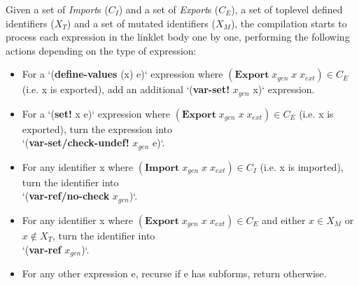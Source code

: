 			\begin{paragraph-here}
				Given a set of \emph{Import}s ($\mathit{C_I}$) and a set of
				\emph{Export}s ($\mathit{C_E}$), a set of toplevel defined
				identifiers ($\mathit{X_T}$) and a set of mutated identifiers
				($\mathit{X_M}$), the compilation starts to process each expression in
				the linklet body one by one, performing the following actions
				depending on the type of expression:

			\end{paragraph-here}

			\begin{itemize}
			\small
			\item For a `(\textbf{define-values} (x) e)` expression where $(\textbf{Export}\; x_{gen}\; x\; x_{ext}) \in \mathit{C_E}$ (i.e. x is exported), add an additional `(\textbf{var-set!} $x_{gen}$ x)` expression.
			\item For a `(\textbf{set!} x e)` expression where $(\textbf{Export}\; x_{gen}\; x\; x_{ext}) \in \mathit{C_E}$ (i.e. x is exported), turn the expression into \\ `(\textbf{var-set/check-undef!} $x_{gen}$ e)`.
			\item For any identifier x where $(\textbf{Import}\; x_{gen}\; x\; x_{ext}) \in \mathit{C_I}$  (i.e. x is imported), turn the identifier into \\ `(\textbf{var-ref/no-check} $x_{gen}$)`.
			\item For any identifier x where $(\textbf{Export}\; x_{gen}\; x\; x_{ext}) \in \mathit{C_E}$ and either $x \in \mathit{X_M}$ or $x \notin \mathit{X_T}$, turn the identifier into \\ `(\textbf{var-ref} $x_{gen}$)`.
			\item For any other expression e, recurse if e has subforms, return otherwise.
			\end{itemize}

